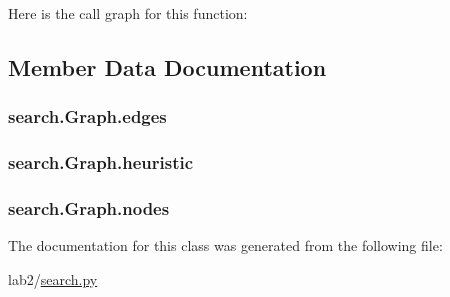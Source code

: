 Here is the call graph for this function\+:




\subsection{Member Data Documentation}
\hypertarget{classsearch_1_1_graph_a2e29e81f7794d05b195570d80c23c106}{}
\subsubsection[{edges}]{\setlength{\rightskip}{0pt plus 5cm}search.\+Graph.\+edges}\label{classsearch_1_1_graph_a2e29e81f7794d05b195570d80c23c106}
\hypertarget{classsearch_1_1_graph_a0fd1667ac41582d336fbe478bbcad079}{}
\subsubsection[{heuristic}]{\setlength{\rightskip}{0pt plus 5cm}search.\+Graph.\+heuristic}\label{classsearch_1_1_graph_a0fd1667ac41582d336fbe478bbcad079}
\hypertarget{classsearch_1_1_graph_ad9dc0fcd37b25bf52be08712fa073c1d}{}
\subsubsection[{nodes}]{\setlength{\rightskip}{0pt plus 5cm}search.\+Graph.\+nodes}\label{classsearch_1_1_graph_ad9dc0fcd37b25bf52be08712fa073c1d}


The documentation for this class was generated from the following file\+:\begin{DoxyCompactItemize}
\item 
lab2/\hyperlink{search_8py}{search.\+py}\end{DoxyCompactItemize}
